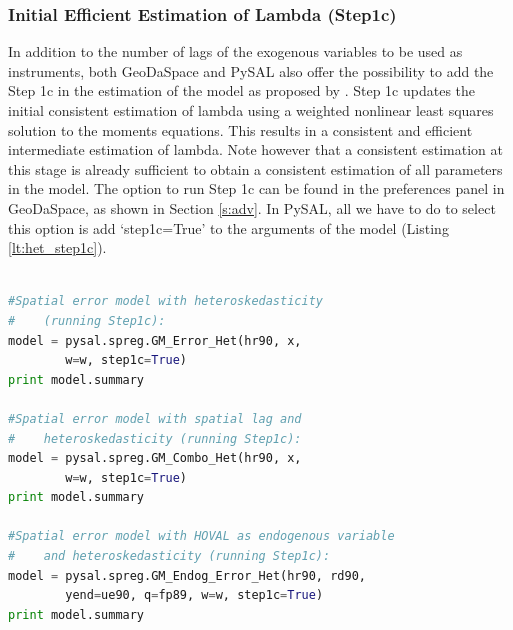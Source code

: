 \documentclass{article}
\begin{document}
\subsubsection{Initial Efficient Estimation of Lambda (Step1c)}
\label{s:step1c}
In addition to the number of lags of the exogenous variables to be used as instruments, both GeoDaSpace and PySAL also offer the possibility to add the Step 1c in the estimation of the model as proposed by \citet{Arraiz10}. Step 1c updates the initial consistent estimation of lambda using a weighted nonlinear least squares solution to the moments equations. This results in a consistent and efficient intermediate estimation of lambda. Note however that a consistent estimation at this stage is already sufficient to obtain a consistent estimation of all parameters in the model. The option to run Step 1c can be found in the preferences panel in GeoDaSpace, as shown in Section \ref{s:adv}. In PySAL, all we have to do to select this option is add `step1c=True' to the arguments of the model (Listing \ref{lt:het_step1c}).

\begin{code}
\begin{lstlisting}[label=lt:het_step1c,caption=Using PySAL to match the results of spatial error models with heteroskedasticity and endogenous variables or spatial lag from Stata,language=Python]

#Spatial error model with heteroskedasticity
#    (running Step1c):
model = pysal.spreg.GM_Error_Het(hr90, x,
        w=w, step1c=True)
print model.summary

#Spatial error model with spatial lag and
#    heteroskedasticity (running Step1c):
model = pysal.spreg.GM_Combo_Het(hr90, x,
        w=w, step1c=True)
print model.summary

#Spatial error model with HOVAL as endogenous variable
#    and heteroskedasticity (running Step1c):
model = pysal.spreg.GM_Endog_Error_Het(hr90, rd90,
        yend=ue90, q=fp89, w=w, step1c=True)
print model.summary

\end{lstlisting}
\end{code}


\newpage


\end{document}
